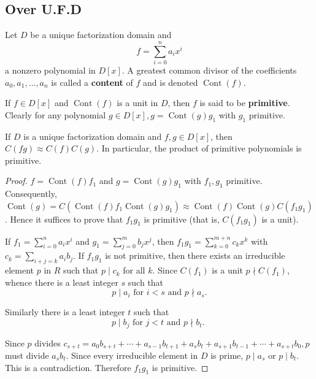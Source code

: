 \subsection{Over U.F.D}  %
\begin{definition}
    Let $D$ be a unique factorization domain and
    \begin{equation*}
        f
        =
        \sum_{i=0}^n a_i x^i
    \end{equation*}
    a nonzero polynomial in $D[x]$. A greatest common divisor of the coefficients $a_0, a_1, \ldots, a_n$ is called a \textbf{content} of $f$ and is denoted $\operatorname{Cont}(f)$.

    If $f \in D[x]$ and $\operatorname{Cont}(f)$ is a unit in $D$, then $f$ is said to be \textbf{primitive}. Clearly for any polynomial $g \in D[x], g=\operatorname{Cont}(g) g_1$ with $g_1$ primitive.
\end{definition}


\begin{theorem}[Gauss]
    \label{thm: Gauss's lemma}
    If $D$ is a unique factorization domain and $ {f},  {g} \in  D[ {x}]$, then $ C( fg) \approx  C( {f})  C( {g})$.
    In particular, the product of primitive polynomials is primitive.

    \begin{proof}
        $f=\operatorname{Cont}(f) f_1$ and $g=\operatorname{Cont}(g) g_1$ with $f_1, g_1$ primitive. Consequently, $\operatorname{Cont}(g)=C\left(\operatorname{Cont}(f) f_1 \operatorname{Cont}(g) g_1\right) \approx \operatorname{Cont}(f) \operatorname{Cont}(g) C\left(f_1 g_1\right)$. Hence it suffices to prove that $f_1 g_1$ is primitive (that is, $C\left(f_1 g_1\right)$ is a unit).

        If $f_1=\sum_{i=0}^n a_i x^i$ and $g_1=\sum_{j=0}^m b_j x^j$, then $f_1 g_1=\sum_{k=0}^{m+n} c_k x^k$ with $c_k=\sum_{i+j=k} a_i b_j$. If $f_1 g_1$ is not primitive, then there exists an irreducible element $p$ in $R$ such that $p \mid c_k$ for all $k$. Since $C\left(f_1\right)$ is a unit $p \nmid C\left(f_1\right)$, whence there is a least integer $s$ such that
        \begin{equation*}
            p \mid a_i \text { for } i<s \text { and } p \nmid a_s .
        \end{equation*}

        Similarly there is a least integer $t$ such that
        \begin{equation*}
            p \mid b_j \text { for } j<t \text { and } p \nmid b_t \text {. }
        \end{equation*}

        Since $p$ divides $c_{s+t}=a_0 b_{s+t}+\cdots+a_{s-1} b_{t+1}+a_s b_t+a_{s+1} b_{t-1}+\cdots+a_{s+t} b_0, p$ must divide $a_s b_t$. Since every irreducible element in $D$ is prime, $p \mid a_s$ or $p \mid b_t$. This is a contradiction. Therefore $f_1 g_1$ is primitive.
    \end{proof}
\end{theorem}


